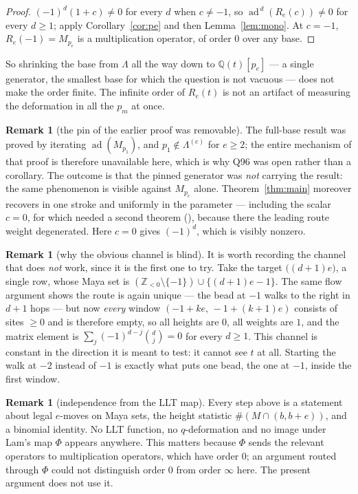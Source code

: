 \documentclass[11pt]{article}
\theoremstyle{definition}
\newtheorem{remark}[theorem]{Remark}
\DeclareMathOperator{\ad}{ad}
\newcommand{\Z}{\mathbb{Z}}
\newcommand{\Q}{\mathbb{Q}}
\newcommand{\Lam}{\Lambda}
\begin{document}
\begin{proof}
$(-1)^d(1+c)\neq0$ for every $d$ when $c\neq-1$, so $\ad^{\,d}(R_e(c))\neq0$ for every
$d\ge1$; apply Corollary~\ref{cor:pe} and then Lemma~\ref{lem:mono}.  At $c=-1$,
$R_e(-1)=M_{p_e}$ is a multiplication operator, of order $0$ over any base.
\end{proof}

So shrinking the base from $\Lam$ all the way down to $\Q(t)[p_e]$ --- a single generator,
the smallest base for which the question is not vacuous --- does not make the order finite.
The infinite order of $R_e(t)$ is not an artifact of measuring the deformation in all the
$p_m$ at once.

\begin{remark}[the pin of the earlier proof was removable]\label{rem:pin}
The full-base result \cite[Cor.~4.9]{Clio0906} was proved by iterating $\ad(M_{p_1})$, and
$p_1\notin\Lam^{(e)}$ for $e\ge2$; the entire mechanism of that proof is therefore
unavailable here, which is why Q96 was open rather than a corollary.  The outcome is that
the pinned generator was \emph{not} carrying the result: the same phenomenon is visible
against $M_{p_e}$ alone.  Theorem~\ref{thm:main} moreover recovers
\cite[Cor.~4.9]{Clio0906} in one stroke and uniformly in the parameter --- including the
scalar $c=0$, for which \cite{Clio0906} needed a second theorem
(\cite[Thm.~B]{Clio0906}), because there the leading route weight degenerated.  Here
$c=0$ gives $(-1)^d$, which is visibly nonzero.
\end{remark}

\begin{remark}[why the obvious channel is blind]\label{rem:blind}
It is worth recording the channel that does \emph{not} work, since it is the first one to
try.  Take the target $\bigl((d+1)e\bigr)$, a single row, whose Maya set is
$(\Z_{<0}\setminus\{-1\})\cup\{(d+1)e-1\}$.  The same flow argument shows the route is
again unique --- the bead at $-1$ walks to the right in $d+1$ hops --- but now
\emph{every} window $(-1+ke,\,-1+(k+1)e)$ consists of sites $\ge0$ and is therefore empty,
so all heights are $0$, all weights are $1$, and the matrix element is
$\sum_j(-1)^{d-j}\binom dj=0$ for every $d\ge1$.  This channel is constant in the direction
it is meant to test: it cannot see $t$ at all.  Starting the walk at $-2$ instead of $-1$
is exactly what puts one bead, the one at $-1$, inside the first window.
\end{remark}

\begin{remark}[independence from the LLT map]\label{rem:lam}
Every step above is a statement about legal $e$-moves on Maya sets, the height statistic
$\#(M\cap(b,b+e))$, and a binomial identity.  No LLT function, no $q$-deformation and no
image under Lam's map $\Phi$ appears anywhere.  This matters because $\Phi$ sends the
relevant operators to multiplication operators, which have order $0$; an argument routed
through $\Phi$ could not distinguish order $0$ from order $\infty$ here.  The present
argument does not use it.
\end{remark}
\end{document}
